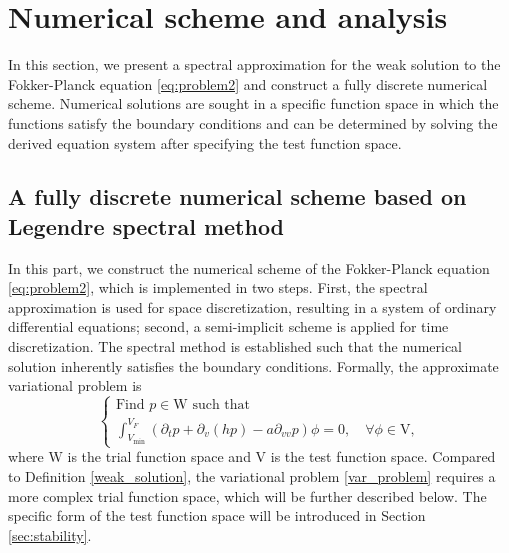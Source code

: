 
\section{Numerical scheme and analysis}\label{sec:scheme}
In this section, we present a spectral approximation for the weak solution to the Fokker-Planck equation \eqref{eq:problem2} and construct a fully discrete numerical scheme. Numerical solutions are sought in a specific function space in which the functions satisfy the boundary conditions and can be determined by solving the derived equation system after specifying the test function space.
\subsection{A fully discrete numerical scheme based on Legendre spectral method}\label{sec:fully_discrete_scheme}
In this part, we construct the numerical scheme of the Fokker-Planck equation \eqref{eq:problem2}, which is implemented in two steps. First, the spectral approximation is used for space discretization, resulting in a system of ordinary differential equations; second, a semi-implicit scheme is applied for time discretization. The spectral method is established such that the numerical solution inherently satisfies the boundary conditions. Formally, the approximate variational problem is
\begin{equation}
    \label{var_problem}
    \begin{cases}
        \text{Find } p\in \mathrm{W} \text{ such that}\\
        \int_{V_{\min}}^{V_{F}} \left(
    \partial_{t}p+\partial_{v}(hp)-a\partial_{v v}p\right)\phi =0,\quad \forall \phi \in \mathrm{V},
    \end{cases}
\end{equation}
where $\mathrm{W}$ is the trial function space and $\mathrm{V}$ is the test function space. Compared to Definition \ref{weak_solution}, the variational problem \eqref{var_problem} requires a more complex trial function space, which will be further described below. The specific form of the test function space will be introduced in Section \ref{sec:stability}.
